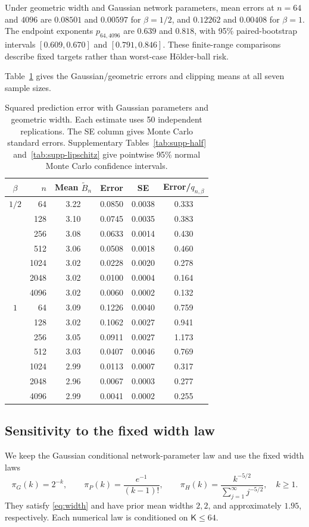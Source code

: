 \documentclass[11pt,a4paper]{article}
\theoremstyle{remark}
\begin{document}
{Under geometric width and Gaussian network parameters, mean errors at $n=64$ and $4096$ are $0.08501$ and $0.00597$ for $\beta=1/2$, and $0.12262$ and $0.00408$ for $\beta=1$. The endpoint exponents $p_{64,4096}$ are $0.639$ and $0.818$, with 95\% paired-bootstrap intervals $[0.609,0.670]$ and $[0.791,0.846]$. These finite-range comparisons describe fixed targets rather than worst-case H\"older-ball risk.}

Table~\ref{tab:simulation-adaptive-risk} gives the Gaussian/geometric
errors and clipping means at all seven sample sizes.
\begin{table}[t]
\caption{Squared prediction error with Gaussian parameters and geometric width. Each estimate uses 50 independent replications. The SE column gives Monte Carlo standard errors. Supplementary Tables~\ref{tab:supp-half} and~\ref{tab:supp-lipschitz} give pointwise 95\% normal Monte Carlo confidence intervals.}
\label{tab:simulation-adaptive-risk}
\centering\small
\begin{tabular}{@{}crcccc@{}}
\toprule
$\beta$ & $n$ & Mean $\widetilde B_n$ & Error & SE & Error/$q_{n,\beta}$\\
\midrule
$1/2$ & 64 & 3.22 & 0.0850 & 0.0038 & 0.333\\
 & 128 & 3.10 & 0.0745 & 0.0035 & 0.383\\
 & 256 & 3.08 & 0.0633 & 0.0014 & 0.430\\
 & 512 & 3.06 & 0.0508 & 0.0018 & 0.460\\
 & 1024 & 3.02 & 0.0228 & 0.0020 & 0.278\\
 & 2048 & 3.02 & 0.0100 & 0.0004 & 0.164\\
 & 4096 & 3.02 & 0.0060 & 0.0002 & 0.132\\
\midrule
$1$ & 64 & 3.09 & 0.1226 & 0.0040 & 0.759\\
 & 128 & 3.02 & 0.1062 & 0.0027 & 0.941\\
 & 256 & 3.05 & 0.0911 & 0.0027 & 1.173\\
 & 512 & 3.03 & 0.0407 & 0.0046 & 0.769\\
 & 1024 & 2.99 & 0.0113 & 0.0007 & 0.317\\
 & 2048 & 2.96 & 0.0067 & 0.0003 & 0.277\\
 & 4096 & 2.99 & 0.0041 & 0.0002 & 0.255\\
\bottomrule
\end{tabular}
\end{table}

\subsection{Sensitivity to the fixed width law}
\label{app:simulation-width}
We keep the Gaussian conditional network-parameter law and use the fixed width
laws
\begin{equation}\label{eq:simulation-width-laws}
\pi_G(k)=2^{-k},\qquad
\pi_P(k)=\frac{e^{-1}}{(k-1)!},\qquad
\pi_H(k)=\frac{k^{-5/2}}{\sum_{j=1}^\infty j^{-5/2}},\quad k\geq1.
\end{equation}
They satisfy \eqref{eq:width} and have prior mean widths $2,2$, and
approximately $1.95$, respectively. Each numerical law is
conditioned on $\mathsf K\leq64$.
\end{document}
